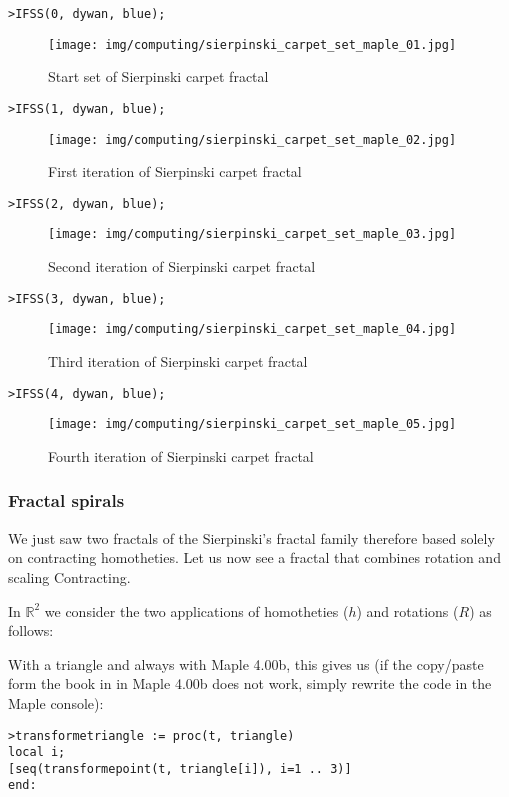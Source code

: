 	\texttt{>IFSS(0, dywan, blue);}
	\begin{figure}[H]
		\centering
		\texttt{[image: img/computing/sierpinski\_carpet\_set\_maple\_01.jpg]}
		\caption[]{Start set of Sierpinski carpet fractal}
	\end{figure}
	\texttt{>IFSS(1, dywan, blue);}
	\begin{figure}[H]
		\centering
		\texttt{[image: img/computing/sierpinski\_carpet\_set\_maple\_02.jpg]}
		\caption[]{First iteration of Sierpinski carpet fractal}
	\end{figure}
	\texttt{>IFSS(2, dywan, blue);}
	\begin{figure}[H]
		\centering
		\texttt{[image: img/computing/sierpinski\_carpet\_set\_maple\_03.jpg]}
		\caption[]{Second iteration of Sierpinski carpet fractal}
	\end{figure}
	\texttt{>IFSS(3, dywan, blue);}
	\begin{figure}[H]
		\centering
		\texttt{[image: img/computing/sierpinski\_carpet\_set\_maple\_04.jpg]}
		\caption[]{Third iteration of Sierpinski carpet fractal}
	\end{figure}
	\texttt{>IFSS(4, dywan, blue);}
	\begin{figure}[H]
		\centering
		\texttt{[image: img/computing/sierpinski\_carpet\_set\_maple\_05.jpg]}
		\caption[]{Fourth iteration of Sierpinski carpet fractal}
	\end{figure}
	
	\pagebreak
	\subsubsection{Fractal spirals}
	We just saw two fractals of the Sierpinski's fractal family therefore based solely on contracting homotheties. Let us now see a fractal that combines rotation and scaling Contracting.
	
	In $\mathbb{R}^2$ we consider the two applications of homotheties ($h$) and rotations ($R$) as follows:
	
	With a triangle and always with Maple 4.00b, this gives us (if the copy/paste form the book in in Maple 4.00b does not work, simply rewrite the code in the Maple console):
	
	\texttt{>transforme\textunderscore triangle := proc(t, triangle)}\\
     \texttt{local i;}\\
     \texttt{[seq(transforme\textunderscore point(t, triangle[i]), i=1 .. 3)]}\\
	\texttt{end:}\\

